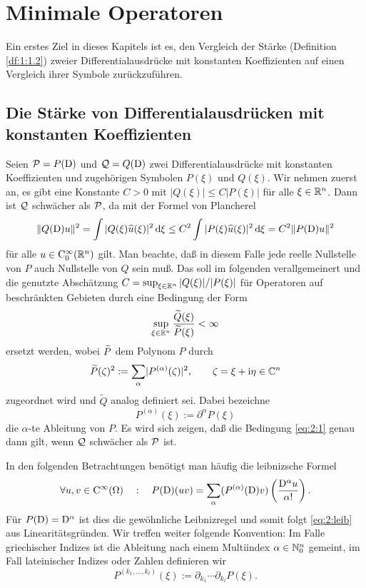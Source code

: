 \chapter{Minimale Operatoren}

Ein erstes Ziel in dieses Kapitels ist es, den Vergleich der Stärke (Definition \ref{df:1:1.2})
zweier Differentialausdrücke mit konstanten Koeffizienten auf einen Vergleich ihrer Symbole zurückzuführen.

\section{Die Stärke von Differentialausdrücken mit konstanten Koeffizienten}

Seien $\mathcal P=P(\mathrm D)$ und $\mathcal Q=Q(\mathrm D)$ zwei Differentialausdrücke mit konstanten Koeffizienten und zugehörigen Symbolen $P(\xi)$ und $Q(\xi)$. Wir nehmen zuerst an, es gibt eine Konstante $C>0$ mit $|Q(\xi)|\le C|P(\xi)|$ für alle $\xi\in\mathbb R^n$. Dann ist $\mathcal Q$ schwächer als $\mathcal P$, da mit der Formel von Plancherel 
\begin{equation}
    \|Q(\mathrm D) u\|^2 = \int |Q(\xi)\widehat u(\xi)|^2 \,\mathrm d\xi \le C^2 \int |P(\xi)\widehat u(\xi)|^2 \,\mathrm d\xi = C^2 \|P(\mathrm D)u \|^2 
\end{equation}
für alle $u\in\mathrm C_0^\infty(\mathbb R^n)$ gilt. Man beachte, daß in diesem Falle jede reelle Nullstelle von $P$ auch Nullstelle von $Q$ sein muß. Das soll im folgenden verallgemeinert und die genutzte Abschätzung $C=\sup_{\xi\in\mathbb R^n} |Q(\xi)|/|P(\xi)|$ für Operatoren auf beschränkten Gebieten  durch eine Bedingung der Form
\begin{equation}\label{eq:2:1}
\sup_{\xi\in\mathbb R^n}\frac{\widetilde{Q}(\xi)}{\widetilde{P}(\xi)}<\infty
\end{equation}
ersetzt werden, wobei $\widetilde{P}$ dem Polynom $P$ durch
\begin{equation}\label{eq:2:2}
\widetilde{P}(\zeta)^2:=\sum_\alpha\lvert P^{(\alpha)}(\zeta)\rvert^2,\qquad \zeta=\xi+\mathrm i\eta \in\mathbb C^n
\end{equation}
zugeordnet wird und $\widetilde Q$ analog definiert sei. Dabei bezeichne 
\begin{equation}
P^{(\alpha)}(\xi):=\partial^\alpha P(\xi)
\end{equation}
die $\alpha$-te Ableitung von $P$. Es wird sich zeigen, daß die Bedingung \eqref{eq:2:1} genau dann gilt, wenn $\mathcal Q$ schwächer als $\mathcal P$ ist.

In den folgenden Betrachtungen benötigt man häufig die leibnizsche Formel
\begin{equation}\label{eq:2:leib}
\forall u,v\in \mathrm C^\infty(\Omega) \quad:\quad P(\mathrm D)(uv)=\sum_{\alpha}(P^{(\alpha)}(\mathrm D)v)\left(\frac{\mathrm D^\alpha u}{\alpha!}\right).
\end{equation} 
Für $P(\mathrm D)=\mathrm D^\alpha$ ist dies die gewöhnliche Leibnizregel und somit folgt \eqref{eq:2:leib} aus Linearitätsgründen. Wir treffen weiter folgende Konvention:
Im Falle griechischer Indizes
ist die Ableitung nach einem Multiindex $\alpha\in\mathbb N^n_0$ gemeint,
im Fall lateinischer Indizes oder Zahlen definieren wir
\begin{equation}
P^{(k_1,\dots,k_l)}(\xi):=\partial_{k_1}\cdots\partial_{k_l}P(\xi).
\end{equation}

